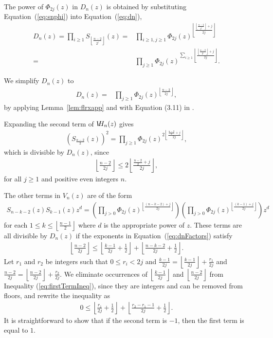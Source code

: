 \documentclass[12pt]{amsart}
\newcommand{\lref}[1]{Lemma~\ref{lem:#1}}
\newcommand{\eref}[1]{Equation~(\ref{eq:#1})}
\newcommand\flr[2]{\left\lfloor \frac{#1}{#2} \right\rfloor}
\newcommand{\vd}{V}
\newcommand{\vh}{V\hspace{-5pt}H}
\begin{document}
The power of $\Phi_{2j}(z)$ in $D_n(z)$ is obtained by substituting
\eref{snphi} into \eref{dn},
\begin{align*}
  D_n(z)= \prod_{i\ge 1}S_{\flr{n-2}{2^i}}(z) =& \prod_{i\ge 1,j\ge 1}
   \Phi_{2j} (z)^{\left\lfloor
      \frac{\flr{n-2}{2^i}+j}{2j}
    \right\rfloor} \\
  =& \prod_{j\ge 1}  \Phi_{2j} (z)^{\sum_{i\ge 1}
    \flr{\flr{n-2}{2^i}+j}{2j}}.
\end{align*}

We simplify $D_n(z)$ to
  \begin{align}
    \label{eq:dnFactors}
  D_n(z)=& \prod_{j\ge 1}  \Phi_{2j} (z)^{\flr{n-2}{2j}},
\end{align}
by applying \lref{flrxapp} and with Equation (3.11) in
\cite{GrahamKnuthPatashnik1994}.

Expanding the second term of $\vh_n(z)$ gives
\begin{align*}
  \left(S_{\frac{n-2}{2}}(z)\right)^2 = \prod_{j\ge 1} 
    \Phi_{2j} (z)^{2\flr{\frac{n-2}{2}+j}{2j}},
\end{align*}
which is divisible by $D_n(z)$, since
\begin{align*}
  \flr{n-2}{2j}\le 2\flr{\frac{n-2}{2}+j}{2j},
\end{align*}
for all $j\ge 1$ and positive even integers $n$.


The other terms in $\vd_n(z)$ are of the form
\begin{align*}
  S_{n-k-2}(z)S_{k-1}(z)z^d = \left(\prod_{j>0}
    \Phi_{2j}(z)^{\flr{(n-k-2) + j}{2j}}\right)\left(\prod_{j>0}
    \Phi_{2j}(z)^{\flr{(k-1)+j}{2j}}\right)
  z^d
\end{align*}
for each $1\le k\le \flr{n-1}{2}$
where $d$ is the appropriate power of $z$. These terms are all
divisible by $D_n(z)$ if the exponents in \eref{dnFactors} satisfy
\begin{align}
  \label{eq:firstTermIneq}
  \flr{n-2}{2j}\le
  \left\lfloor \frac{k-1}{2j} + \frac{1}{2} \right\rfloor
  +\left\lfloor \frac{n-k-2}{2j} + \frac{1}{2} \right\rfloor.
\end{align}
Let $r_1$ and $r_2$ be integers such that ${0\le r_i < 2j}$ and
$\frac{k-1}{2j} = \flr{k-1}{2j} + \frac{r_1}{2j}$ and $\frac{n-2}{2j}
= \flr{n-2}{2j} + \frac{r_2}{2j}$.  We eliminate occurrences of
$\flr{k-1}{2j}$ and $\flr{n-2}{2j}$ from Inequality
(\ref{eq:firstTermIneq}), since they are integers and can be removed
from floors, and rewrite the inequality as
\begin{align}
  \label{eq:firstTermIneqRewrite}
  0 \le \left\lfloor \frac{r_1}{2j} + \frac{1}{2} \right\rfloor
  +\left\lfloor \frac{r_2-r_1-1}{2j} + \frac{1}{2} \right\rfloor.
\end{align}
It is straightforward to show that if the second term is $-1$, then
the first term is equal to $1$.
\end{document}
